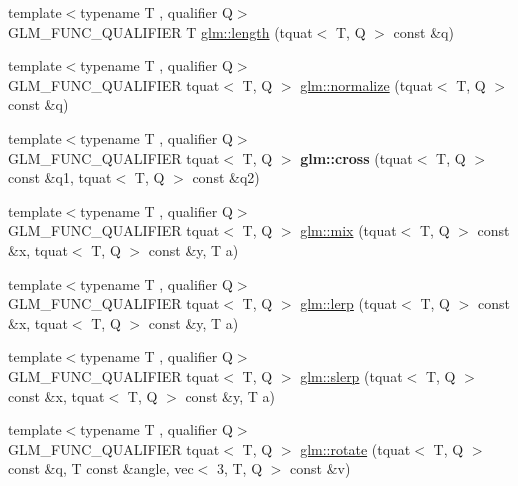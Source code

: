 \begin{DoxyCompactItemize}
\item 
{\footnotesize template$<$typename T , qualifier Q$>$ }\\G\+L\+M\+\_\+\+F\+U\+N\+C\+\_\+\+Q\+U\+A\+L\+I\+F\+I\+ER T \hyperlink{group__gtc__quaternion_gab33f82f8d1c9223d335aab752a126855}{glm\+::length} (tquat$<$ T, Q $>$ const \&q)
\item 
{\footnotesize template$<$typename T , qualifier Q$>$ }\\G\+L\+M\+\_\+\+F\+U\+N\+C\+\_\+\+Q\+U\+A\+L\+I\+F\+I\+ER tquat$<$ T, Q $>$ \hyperlink{group__gtc__quaternion_gad4f3769e33c18d1897d1857c1f8da864}{glm\+::normalize} (tquat$<$ T, Q $>$ const \&q)
\item 
\mbox{\label{gtc_2quaternion_8inl_ac560ba8781ceedbf7a225dbf1b99f78b}} 
{\footnotesize template$<$typename T , qualifier Q$>$ }\\G\+L\+M\+\_\+\+F\+U\+N\+C\+\_\+\+Q\+U\+A\+L\+I\+F\+I\+ER tquat$<$ T, Q $>$ {\bfseries glm\+::cross} (tquat$<$ T, Q $>$ const \&q1, tquat$<$ T, Q $>$ const \&q2)
\item 
{\footnotesize template$<$typename T , qualifier Q$>$ }\\G\+L\+M\+\_\+\+F\+U\+N\+C\+\_\+\+Q\+U\+A\+L\+I\+F\+I\+ER tquat$<$ T, Q $>$ \hyperlink{group__gtc__quaternion_ga6c31ccbb8548b2b24226901e602dfc0a}{glm\+::mix} (tquat$<$ T, Q $>$ const \&x, tquat$<$ T, Q $>$ const \&y, T a)
\item 
{\footnotesize template$<$typename T , qualifier Q$>$ }\\G\+L\+M\+\_\+\+F\+U\+N\+C\+\_\+\+Q\+U\+A\+L\+I\+F\+I\+ER tquat$<$ T, Q $>$ \hyperlink{group__gtc__quaternion_gabc58e7013ef63d6df69c28c14afd0c01}{glm\+::lerp} (tquat$<$ T, Q $>$ const \&x, tquat$<$ T, Q $>$ const \&y, T a)
\item 
{\footnotesize template$<$typename T , qualifier Q$>$ }\\G\+L\+M\+\_\+\+F\+U\+N\+C\+\_\+\+Q\+U\+A\+L\+I\+F\+I\+ER tquat$<$ T, Q $>$ \hyperlink{group__gtc__quaternion_ga3796542dac06014d541d67ebd5f2a88a}{glm\+::slerp} (tquat$<$ T, Q $>$ const \&x, tquat$<$ T, Q $>$ const \&y, T a)
\item 
{\footnotesize template$<$typename T , qualifier Q$>$ }\\G\+L\+M\+\_\+\+F\+U\+N\+C\+\_\+\+Q\+U\+A\+L\+I\+F\+I\+ER tquat$<$ T, Q $>$ \hyperlink{group__gtc__quaternion_ga21c6e3b6104c9b8116a35ddf2ac4d358}{glm\+::rotate} (tquat$<$ T, Q $>$ const \&q, T const \&angle, vec$<$ 3, T, Q $>$ const \&v)
\item 

\end{DoxyCompactItemize}
